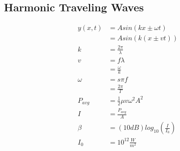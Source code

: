 \documentclass{subfile}
\begin{document}
\subsection{Harmonic Traveling Waves}

\begin{align}
	y(x,t) &= A sin (kx \pm \omega t) \label{15:htw:1}\\
	&= A sin(k(x \pm vt)) \label{15:htw:2}\\
	k &= \frac{2\pi}{\lambda} \label{15:htw:3}\\
	v &= f\lambda \label{15:htw:4}\\
	&= \frac{\omega}{k} \label{15:htw:5}\\
	\omega &= s\pi f \label{15:htw:6}\\
	&= \frac{2\pi}{T} \label{15:htw:7}\\
	P_{avg} &= \frac{1}{2}\mu v \omega^{2}A^{2} \label{15:htw:8}\\
	I &= \frac{P_{avg}}{A} \label{15:htw:9}\\
	\beta &= (10dB)log_{10}\left( \frac{I}{I_{0}}\right) \label{15:htw:10}\\
	I_{0} &= 10^{12}\frac{W}{m^{2}} \label{15:htw:11}
\end{align}
\end{document}
